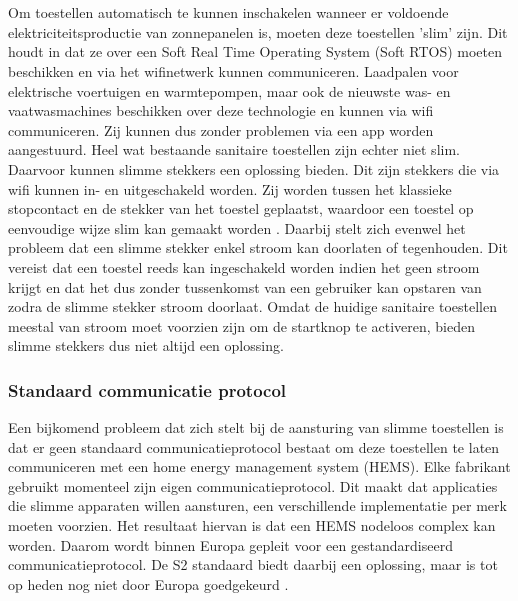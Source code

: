 \section{}%
\label{sec:Slimme toestellen aansturen}

Om toestellen automatisch te kunnen inschakelen wanneer er voldoende elektriciteitsproductie van zonnepanelen is, moeten deze toestellen 'slim' zijn. Dit houdt in dat ze over een Soft Real Time Operating System (Soft RTOS) moeten beschikken en via het wifinetwerk kunnen communiceren. Laadpalen voor elektrische voertuigen en warmtepompen, maar ook de nieuwste was- en vaatwasmachines beschikken over deze technologie en kunnen via wifi communiceren. Zij kunnen dus zonder problemen via een app worden aangestuurd. Heel wat bestaande sanitaire toestellen zijn echter niet slim. Daarvoor kunnen slimme stekkers een oplossing bieden. Dit zijn stekkers die via wifi kunnen in- en uitgeschakeld worden. Zij worden tussen het klassieke stopcontact en de stekker van het toestel geplaatst, waardoor een toestel op eenvoudige wijze slim kan gemaakt worden \autocite{Jong2020}. Daarbij stelt zich evenwel het probleem dat een slimme stekker enkel stroom kan doorlaten of tegenhouden. Dit vereist dat een toestel reeds kan ingeschakeld worden indien het geen stroom krijgt en dat het dus zonder tussenkomst van een gebruiker kan opstaren van zodra de slimme stekker stroom doorlaat. Omdat de huidige sanitaire toestellen meestal van stroom moet voorzien zijn om de startknop te activeren, bieden slimme stekkers dus niet altijd een oplossing. \\

\subsubsection{Standaard communicatie protocol}

Een bijkomend probleem dat zich stelt bij de aansturing van slimme toestellen is dat er geen standaard communicatieprotocol bestaat om deze toestellen te laten communiceren met een home energy management system (HEMS). Elke fabrikant gebruikt momenteel zijn eigen communicatieprotocol. Dit maakt dat applicaties die slimme apparaten willen aansturen, een verschillende implementatie per merk moeten voorzien. Het resultaat hiervan is dat een HEMS nodeloos complex kan worden. Daarom wordt binnen Europa gepleit voor een gestandardiseerd communicatieprotocol. De S2 standaard biedt daarbij een oplossing, maar is tot op heden nog niet door Europa goedgekeurd \autocite{Konsman2023a}.